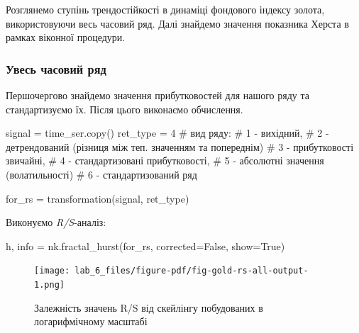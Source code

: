 \documentclass[
  letterpaper,
]{report}
\newenvironment{Shaded}{\begin{snugshade}}{\end{snugshade}}
\newcommand{\CommentTok}[1]{\textcolor[rgb]{0.37,0.37,0.37}{#1}}
\newcommand{\DecValTok}[1]{\textcolor[rgb]{0.68,0.00,0.00}{#1}}
\newcommand{\NormalTok}[1]{\textcolor[rgb]{0.00,0.23,0.31}{#1}}
\newcommand{\OperatorTok}[1]{\textcolor[rgb]{0.37,0.37,0.37}{#1}}
\newcommand{\VariableTok}[1]{\textcolor[rgb]{0.07,0.07,0.07}{#1}}
\begin{document}
Розглянемо ступінь трендостійкості в динаміці фондового індексу золота,
використовуючи весь часовий ряд. Далі знайдемо значення показника Херста
в рамках віконної процедури.

\hypertarget{ux443ux432ux435ux441ux44c-ux447ux430ux441ux43eux432ux438ux439-ux440ux44fux434}{%
\subsubsection{Увесь часовий
ряд}\label{ux443ux432ux435ux441ux44c-ux447ux430ux441ux43eux432ux438ux439-ux440ux44fux434}}

Першочергово знайдемо значення прибутковостей для нашого ряду та
стандартизуємо їх. Після цього виконаємо обчислення.

\begin{Shaded}
\begin{Highlighting}[]
\NormalTok{signal }\OperatorTok{=}\NormalTok{ time\_ser.copy()}
\NormalTok{ret\_type }\OperatorTok{=} \DecValTok{4}    \CommentTok{\# вид ряду: }
                \CommentTok{\# 1 {-} вихідний, }
                \CommentTok{\# 2 {-} детрендований (різниця між теп. значенням та попереднім)}
                \CommentTok{\# 3 {-} прибутковості звичайні, }
                \CommentTok{\# 4 {-} стандартизовані прибутковості, }
                \CommentTok{\# 5 {-} абсолютні значення (волатильності)}
                \CommentTok{\# 6 {-} стандартизований ряд}

\NormalTok{for\_rs }\OperatorTok{=}\NormalTok{ transformation(signal, ret\_type) }
\end{Highlighting}
\end{Shaded}

Виконуємо \emph{R/S}-аналіз:

\begin{Shaded}
\begin{Highlighting}[]
\NormalTok{h, info }\OperatorTok{=}\NormalTok{ nk.fractal\_hurst(for\_rs, corrected}\OperatorTok{=}\VariableTok{False}\NormalTok{, show}\OperatorTok{=}\VariableTok{True}\NormalTok{)}
\end{Highlighting}
\end{Shaded}

\begin{figure}[H]

{\centering \texttt{[image: lab\_6\_files/figure-pdf/fig-gold-rs-all-output-1.png]}

}

\caption{\label{fig-gold-rs-all}Залежність значень R/S від скейлінгу
побудованих в логарифмічному масштабі}

\end{figure}
\end{document}
